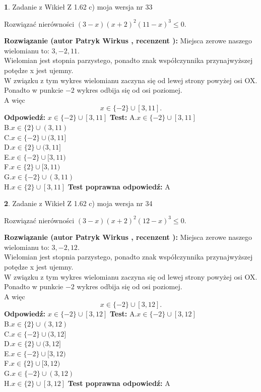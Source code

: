 \documentclass[12pt, a4paper]{article}
\theoremstyle{definition} %
\newtheorem{zad}{}
\newcommand{\zadStart}[1]{\begin{zad}#1\newline}
\newcommand{\zadStop}{\end{zad}}
\newcommand{\rozwStart}[2]{\noindent \textbf{Rozwiązanie (autor #1 , recenzent #2): }\newline}
\newcommand{\rozwStop}{\newline}
\newcommand{\odpStart}{\noindent \textbf{Odpowiedź:}\newline}
\newcommand{\odpStop}{\newline}
\newcommand{\testStart}{\noindent \textbf{Test:}\newline}
\newcommand{\testStop}{\newline}
\newcommand{\kluczStart}{\noindent \textbf{Test poprawna odpowiedź:}\newline}
\newcommand{\kluczStop}{\newline}
\begin{document}
\zadStart{Zadanie z Wikieł Z 1.62 c) moja wersja nr 33}

Rozwiązać nierówności $(3-x)(x+2)^{2}(11-x)^{3}\le0$.
\zadStop
\rozwStart{Patryk Wirkus}{}
Miejsca zerowe naszego wielomianu to: $3, -2, 11$.\\
Wielomian jest stopnia parzystego, ponadto znak współczynnika przy\linebreak najwyższej potędze x jest ujemny.\\ W związku z tym wykres wielomianu zaczyna się od lewej strony powyżej osi OX.\\
Ponadto w punkcie $-2$ wykres odbija się od osi poziomej.\\
A więc $$x \in \{-2\} \cup [3,11].$$
\rozwStop
\odpStart
$x \in \{-2\} \cup [3,11]$
\odpStop
\testStart
A.$x \in \{-2\} \cup [3,11]$\\
B.$x \in \{2\} \cup (3,11)$\\
C.$x \in \{-2\} \cup (3,11]$\\
D.$x \in \{2\} \cup (3,11]$\\
E.$x \in \{-2\} \cup [3,11)$\\
F.$x \in \{2\} \cup [3,11)$\\
G.$x \in \{-2\} \cup (3,11)$\\
H.$x \in \{2\} \cup [3,11]$
\testStop
\kluczStart
A
\kluczStop



\zadStart{Zadanie z Wikieł Z 1.62 c) moja wersja nr 34}

Rozwiązać nierówności $(3-x)(x+2)^{2}(12-x)^{3}\le0$.
\zadStop
\rozwStart{Patryk Wirkus}{}
Miejsca zerowe naszego wielomianu to: $3, -2, 12$.\\
Wielomian jest stopnia parzystego, ponadto znak współczynnika przy\linebreak najwyższej potędze x jest ujemny.\\ W związku z tym wykres wielomianu zaczyna się od lewej strony powyżej osi OX.\\
Ponadto w punkcie $-2$ wykres odbija się od osi poziomej.\\
A więc $$x \in \{-2\} \cup [3,12].$$
\rozwStop
\odpStart
$x \in \{-2\} \cup [3,12]$
\odpStop
\testStart
A.$x \in \{-2\} \cup [3,12]$\\
B.$x \in \{2\} \cup (3,12)$\\
C.$x \in \{-2\} \cup (3,12]$\\
D.$x \in \{2\} \cup (3,12]$\\
E.$x \in \{-2\} \cup [3,12)$\\
F.$x \in \{2\} \cup [3,12)$\\
G.$x \in \{-2\} \cup (3,12)$\\
H.$x \in \{2\} \cup [3,12]$
\testStop
\kluczStart
A
\kluczStop
\end{document}
